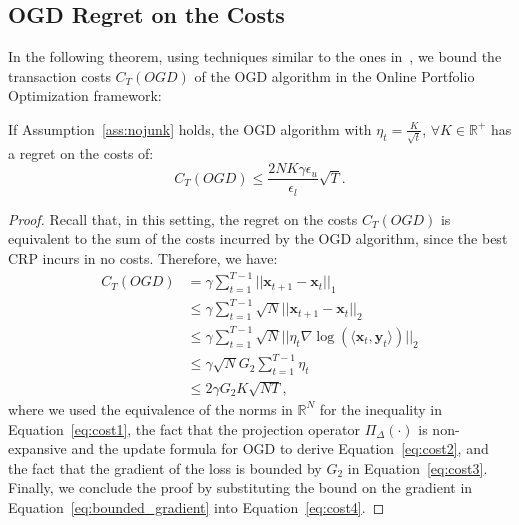 \subsection{OGD Regret on the Costs}
In the following theorem, using techniques similar to the ones in~\cite{andrew2013tale}, we bound the transaction costs $C_T(OGD)$ of the OGD algorithm in the Online Portfolio Optimization framework:
\begin{theorem}\label{th:tc_ogd}
    If Assumption~\ref{ass:nojunk} holds, the OGD algorithm with $\eta_t = \frac{K}{\sqrt{t}}$,  $\forall K \in \mathbb{R}^+$ has a regret on the costs of:
    \begin{equation*}
        C_T(OGD) \leq \frac{2 N K \gamma \epsilon_u}{\epsilon_l} \sqrt{T}.
    \end{equation*}
\end{theorem}

\begin{proof}
Recall that, in this setting, the regret on the costs $C_T(OGD)$ is equivalent to the sum of the costs incurred by the OGD algorithm, since the best CRP incurs in no costs.
Therefore, we have:
\begin{align}
    C_T(OGD) & = \gamma \sum\limits_{t=1}^{T-1} ||\mathbf{x}_{t+1} - \mathbf{x}_{t}||_1 \\
    & \leq \gamma\sum\limits_{t=1}^{T-1} \sqrt{N} ||\mathbf{x}_{t+1} - \mathbf{x}_{t}||_2 \label{eq:cost1}\\
    & \leq \gamma\sum\limits_{t=1}^{T-1}\sqrt{N}|| \eta_t \nabla \log( \langle \mathbf{x}_t, \mathbf{y}_t \rangle)||_2 \label{eq:cost2}\\
    &\leq \gamma\sqrt{N} G_2 \sum\limits_{t=1}^{T-1} \eta_t \label{eq:cost3}\\
    & \leq 2\gamma G_2K\sqrt{NT}, \label{eq:cost4}
\end{align}
where we used the equivalence of the norms in $\mathbb{R}^N$ for the inequality in Equation~\eqref{eq:cost1}, the fact that the projection operator $\Pi_{\Delta}(\cdot)$ is non-expansive and the update formula for OGD to derive Equation~\eqref{eq:cost2}, and the fact that the gradient of the loss is bounded by $G_2$ in Equation~\eqref{eq:cost3}. 
Finally, we conclude the proof by substituting the bound on the gradient in Equation~\eqref{eq:bounded_gradient} into Equation~\eqref{eq:cost4}.
\end{proof}

